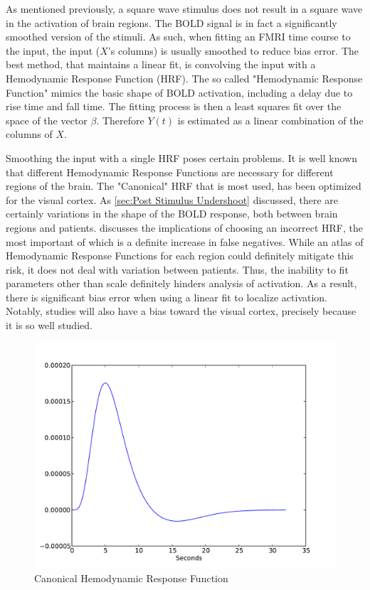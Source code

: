 As mentioned previously, a square wave stimulus 
does not result in a square wave in the activation of brain regions. 
The BOLD signal is in fact a significantly smoothed version of the 
stimuli. As such, when fitting an FMRI time course to the input,
the input ($X$'s columns) is usually smoothed to reduce bias error. 
The best method, that maintains a linear fit, is convolving the input 
with a Hemodynamic 
Response Function (HRF). The so called "Hemodynamic Response Function"
mimics the basic shape of BOLD activation, including a delay
due to rise time and fall time. The fitting 
process is then a least squares fit over the space of the vector $\beta$. 
Therefore $Y(t)$ is estimated as a linear combination 
of the columns of $X$. 

Smoothing the input with a single HRF poses certain problems.
It is well known that different Hemodynamic Response Functions are necessary 
for different regions of the brain. The "Canonical" HRF that is most used, 
has been optimized for the visual cortex. As \autoref{sec:Post Stimulus Undershoot}
discussed, there are certainly variations in the shape of the
BOLD response, both between brain regions and patients.  \cite{Handwerker2004}
discusses the implications of choosing an incorrect HRF, the most important
of which is a definite increase in false negatives. While an atlas
of Hemodynamic Response Functions for each region could definitely 
mitigate this risk, it does not deal with variation between patients.
Thus, the inability to fit parameters other than scale definitely hinders 
analysis of activation. As a result, there is significant bias error
when using a linear fit to localize activation. Notably, studies
will also have a bias toward the visual cortex, precisely because
it is so well studied.

\begin{figure}
\centering
\includegraphics[scale=.7]{images/HRF}
\caption{Canonical Hemodynamic Response Function}
\label{fig:HRF}
\end{figure}


